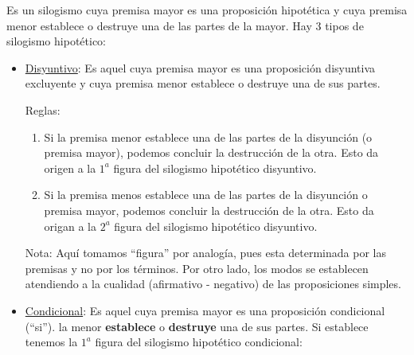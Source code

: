 \documentclass{article}
\begin{document}
Es un silogismo cuya premisa mayor es una proposición hipotética y cuya premisa menor establece o destruye una de las partes de la mayor. Hay 3 tipos de silogismo hipotético:
\begin{itemize}

    \item \underline{Disyuntivo}: Es aquel cuya premisa mayor es una proposición disyuntiva excluyente y cuya premisa menor establece o destruye una de sus partes.
    
    \par Reglas:
    \begin{enumerate}
        \item Si la premisa menor establece una de las partes de la disyunción (o premisa mayor), podemos concluir la destrucción de la otra. Esto da origen a la $1^a$ figura del silogismo hipotético disyuntivo.
        
        \begin{center}
        \end{center}
        
        \item Si la premisa menos establece una de las partes de la disyunción o premisa mayor, podemos concluir la destrucción de la otra. Esto da origan a la $2^a$ figura del silogismo hipotético disyuntivo.
        \begin{center}
        \end{center}
    \end{enumerate}
    Nota: Aquí tomamos ``figura'' por analogía, pues esta determinada por las premisas y no por los términos. Por otro lado, los modos se establecen atendiendo a la cualidad (afirmativo - negativo) de las proposiciones simples.
    \\
    
    \item \underline{Condicional}: Es aquel cuya premisa mayor es una proposición condicional (``si''). la menor \textbf{establece} o \textbf{destruye} una de sus partes. Si establece tenemos la $1^a$ figura del silogismo hipotético condicional:
    
    \begin{center}
    \end{center}
    

\end{itemize}
\end{document}
